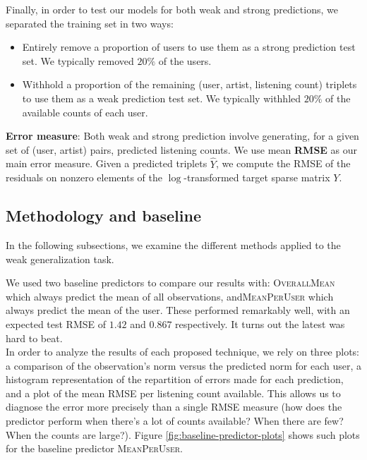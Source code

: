 \documentclass[10pt,a4paper]{article}
\begin{document}
  Finally, in order to test our models for both weak and strong predictions, we separated the training set in two ways:
  \begin{itemize}
    \item Entirely remove a proportion of users to use them as a strong prediction test set. We typically removed $20\%$ of the users.
    \item Withhold a proportion of the remaining (user, artist, listening count) triplets to use them as a weak prediction test set. We typically withhled $20\%$ of the available counts of each user.
  \end{itemize}

  \textbf{Error measure}: Both weak and strong prediction involve generating, for a given set of (user, artist) pairs, predicted listening counts. We use mean \textbf{RMSE} as our main error measure. Given a predicted triplets $\hat{Y}$, we compute the RMSE of the residuals on nonzero elements of the $\log$-transformed target sparse matrix $Y$.


  \subsection{Methodology and baseline}
  In the following subsections, we examine the different methods applied to the weak generalization task.

  We used two baseline predictors to compare our results with: \textsc{OverallMean} which always predict the mean of all observations, and\textsc{MeanPerUser} which always predict the mean of the user. These performed remarkably well, with an expected test RMSE of $1.42$ and $0.867$ respectively. It turns out the latest was hard to beat.\\
  In order to analyze the results of each proposed technique, we rely on three plots: a comparison of the observation's norm versus the predicted norm for each user, a histogram representation of the repartition of errors made for each prediction, and a plot of the mean RMSE per listening count available. This allows us to diagnose the error more precisely than a single RMSE measure (how does the predictor perform when there's a lot of counts available? When there are few? When the counts are large?). Figure \ref{fig:baseline-predictor-plots} shows such plots for the baseline predictor \textsc{MeanPerUser}.
\end{document}
